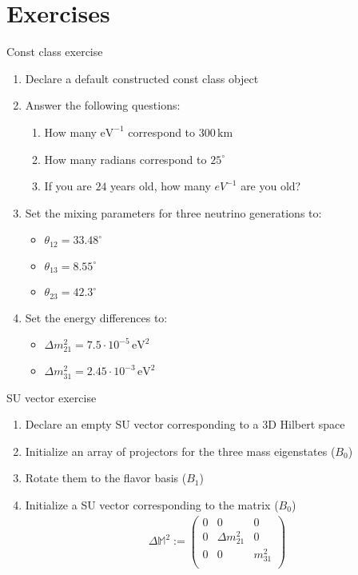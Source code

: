 \documentclass[]{beamer}
\begin{document}
\section{Exercises}


\begin{frame}{Const class exercise}
  \begin{enumerate}
    \item Declare a default constructed const class object
    \item Answer the following questions:
    \begin{enumerate}
      \item How many \(\mathrm{eV}^{-1}\) correspond to \(300\,\mathrm{km}\)
      \item How many radians correspond to \(25^\circ\)
      \item If you are \(24\) years old, how many \(eV^{-1}\) are you old?
    \end{enumerate}
    \item Set the mixing parameters for three neutrino generations to:
    \begin{itemize}
      \item \(\theta_{12} = 33.48^\circ\)
      \item \(\theta_{13} = 8.55^\circ\)
      \item \(\theta_{23} = 42.3^\circ\)
    \end{itemize}
    \item Set the energy differences to:
    \begin{itemize}
      \item \(\Delta m^2_{21} = 7.5 \cdot 10^{-5} \, \mathrm{eV}^2\)
      \item \(\Delta m^2_{31} = 2.45 \cdot 10^{-3} \, \mathrm{eV}^2\)
    \end{itemize}
  \end{enumerate}
\end{frame}

\begin{frame}{SU vector exercise}
  \begin{enumerate}
    \item Declare an empty SU vector corresponding to a 3D Hilbert space
    \item Initialize an array of projectors for the three mass eigenstates (\(B_0\))
    \item Rotate them to the flavor basis (\(B_1\))
    \item Initialize a SU vector corresponding to the matrix (\(B_0\))
    \begin{align}
      \Delta \mathbb{M}^2 := \begin{pmatrix}
        0 & 0 & 0 \\
        0 & \Delta m_{21}^2 & 0 \\
        0 & 0 & m_{31}^2 \\
      \end{pmatrix}
    \end{align}
  \end{enumerate}
\end{frame}
\end{document}
